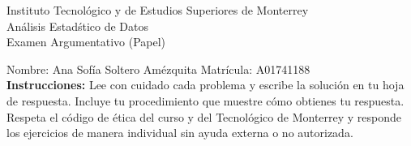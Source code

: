 \documentclass[10pt]{report}
\begin{document}
\newpage



\begin{center}
{\large Instituto Tecnol\'{o}gico y de Estudios Superiores de Monterrey \\
An\'alisis Estad\'stico de Datos } \\
Examen Argumentativo (Papel)
\end{center}

Nombre: \underline{\hspace*{.2in}}
Ana Sof\'ia Soltero Am\'ezquita
\underline{\hspace*{.2in}} \quad Matr\'icula:\underline{\hspace*{.2in}}
A01741188
\underline{\hspace*{.2in}} \\

{\bf Instrucciones:} Lee con cuidado cada problema y escribe la soluci\'on
en tu hoja de respuesta. Incluye tu procedimiento que muestre c\'omo obtienes tu respuesta.  Respeta el c\'odigo de \'etica del curso y del Tecnol\'ogico de Monterrey y responde los ejercicios de manera individual sin ayuda externa o no autorizada.
\end{document}
